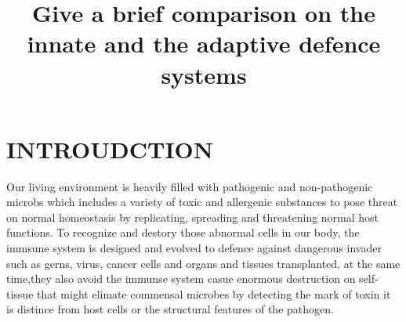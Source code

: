 \documentclass[12pt]{article}
\begin{document}
  
\title{\large Give a brief comparison on the innate and the adaptive defence systems \vspace{-2em}}
\date{\vspace{-2.5em}}
\maketitle

\section{INTROUDCTION}

Our living environment is heavily filled with pathogenic and non-pathogenic microbs which includes a variety of toxic and allergenic substances to pose threat on normal homeostasis by replicating, spreading and threatening normal host functions. To recognize and destory those abnormal cells in our body, the immsune system is designed and evolved to defence against dangerous invader such as gerns, virus, cancer cells and organs and tissues transplanted, at the same time,they also avoid the immunse system casue enormous destruction on self-tissue that might elimate 
commensal microbes by detecting the mark of toxin it is distince from host cells or the structural features of the pathogen. \medskip
\end{document}
